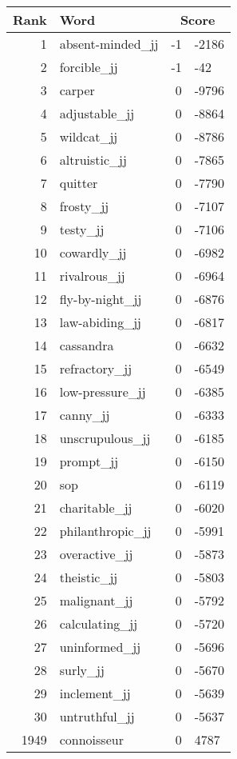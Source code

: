 \begin{longtable}[!htbp]{| rlr@{.}l |}
    \hline
    \textbf{Rank} & \textbf{Word} & \multicolumn{2}{c|}{\textbf{Score}} \\
    \hline
    \endhead
    1 & absent-minded\_jj & -1 & -2186 \\
    2 & forcible\_jj & -1 & -42 \\
    3 & carper & 0 & -9796 \\
    4 & adjustable\_jj & 0 & -8864 \\
    5 & wildcat\_jj & 0 & -8786 \\
    6 & altruistic\_jj & 0 & -7865 \\
    7 & quitter & 0 & -7790 \\
    8 & frosty\_jj & 0 & -7107 \\
    9 & testy\_jj & 0 & -7106 \\
    10 & cowardly\_jj & 0 & -6982 \\
    11 & rivalrous\_jj & 0 & -6964 \\
    12 & fly-by-night\_jj & 0 & -6876 \\
    13 & law-abiding\_jj & 0 & -6817 \\
    14 & cassandra & 0 & -6632 \\
    15 & refractory\_jj & 0 & -6549 \\
    16 & low-pressure\_jj & 0 & -6385 \\
    17 & canny\_jj & 0 & -6333 \\
    18 & unscrupulous\_jj & 0 & -6185 \\
    19 & prompt\_jj & 0 & -6150 \\
    20 & sop & 0 & -6119 \\
    21 & charitable\_jj & 0 & -6020 \\
    22 & philanthropic\_jj & 0 & -5991 \\
    23 & overactive\_jj & 0 & -5873 \\
    24 & theistic\_jj & 0 & -5803 \\
    25 & malignant\_jj & 0 & -5792 \\
    26 & calculating\_jj & 0 & -5720 \\
    27 & uninformed\_jj & 0 & -5696 \\
    28 & surly\_jj & 0 & -5670 \\
    29 & inclement\_jj & 0 & -5639 \\
    30 & untruthful\_jj & 0 & -5637 \\
    1949 & connoisseur & 0 & 4787 \\

\end{longtable}
